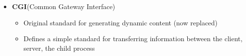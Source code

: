 \documentclass[12pt]{article}
\begin{document}
{\begin{itemize}
\begin{itemize}
		\item Server uses \texttt{dup2} to redirect child's \texttt{stdout} to its connected socket
	\end{itemize}
	\item \textbf{CGI}(Common Gateway Interface)
	\begin{itemize}
		\item Original standard for generating dynamic content (now replaced)
		\item Defines a simple standard for transferring information between the client, server, the child process
	\end{itemize}
\end{itemize}

}
\end{document}
